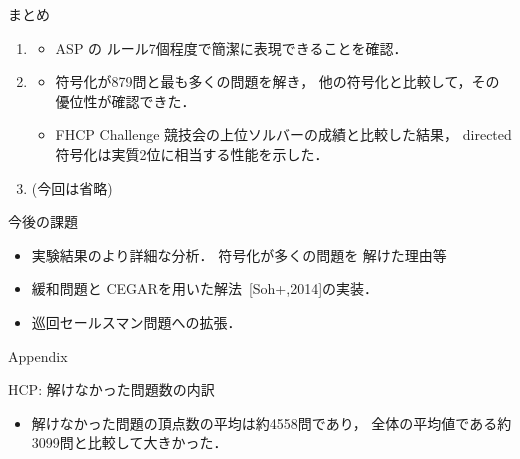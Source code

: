 \documentclass[dvipdfmx]{beamer}
\begin{document}
\begin{frame}{まとめ}

\begin{enumerate}
\item {}
  \begin{itemize}
  \item ASP の \alert{ルール7個}程度で簡潔に表現できることを確認．
  \end{itemize}
\item {}
  \begin{itemize}
  \item {} 符号化が879問と最も多くの問題を解き，
    他の符号化と比較して，その優位性が確認できた．
  \item FHCP Challenge 競技会の上位ソルバーの成績と比較した結果，
    directed 符号化は\alert{実質2位}に相当する性能を示した．
  \end{itemize}
\item {} (今回は省略)
\end{enumerate}

\begin{block}{今後の課題}
  \begin{itemize}
  \item 実験結果のより詳細な分析． 符号化が多くの問題を
    解けた理由等
  \item 緩和問題と CEGARを用いた解法~{\scriptsize[Soh+,2014]}の実装．
  \item 巡回セールスマン問題への拡張．
  \end{itemize}
\end{block}
\end{frame}
\appendix
\begin{frame}{}
  \begin{center}\Huge
    Appendix
  \end{center}
\end{frame}

\begin{frame}{HCP: 解けなかった問題数の内訳}



\begin{itemize}
\item 解けなかった問題の頂点数の平均は約4558問であり，
      全体の平均値である約3099問と比較して大きかった．
\end{itemize}
\end{frame}
\end{document}
